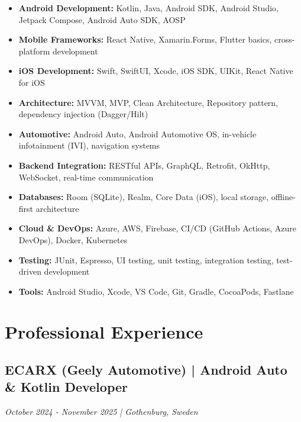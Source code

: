 \documentclass[11pt,a4paper]{article}
\begin{document}
\begin{itemize}[leftmargin=*, itemsep=2pt]
\item \textbf{Android Development:} Kotlin, Java, Android SDK, Android Studio, Jetpack Compose, Android Auto SDK, AOSP
\item \textbf{Mobile Frameworks:} React Native, Xamarin.Forms, Flutter basics, cross-platform development
\item \textbf{iOS Development:} Swift, SwiftUI, Xcode, iOS SDK, UIKit, React Native for iOS
\item \textbf{Architecture:} MVVM, MVP, Clean Architecture, Repository pattern, dependency injection (Dagger/Hilt)
\item \textbf{Automotive:} Android Auto, Android Automotive OS, in-vehicle infotainment (IVI), navigation systems
\item \textbf{Backend Integration:} RESTful APIs, GraphQL, Retrofit, OkHttp, WebSocket, real-time communication
\item \textbf{Databases:} Room (SQLite), Realm, Core Data (iOS), local storage, offline-first architecture
\item \textbf{Cloud \& DevOps:} Azure, AWS, Firebase, CI/CD (GitHub Actions, Azure DevOps), Docker, Kubernetes
\item \textbf{Testing:} JUnit, Espresso, UI testing, unit testing, integration testing, test-driven development
\item \textbf{Tools:} Android Studio, Xcode, VS Code, Git, Gradle, CocoaPods, Fastlane
\end{itemize}

\section*{Professional Experience}

\subsection*{ECARX (Geely Automotive) | Android Auto \& Kotlin Developer}
\textit{October 2024 - November 2025 | Gothenburg, Sweden}
\end{document}
